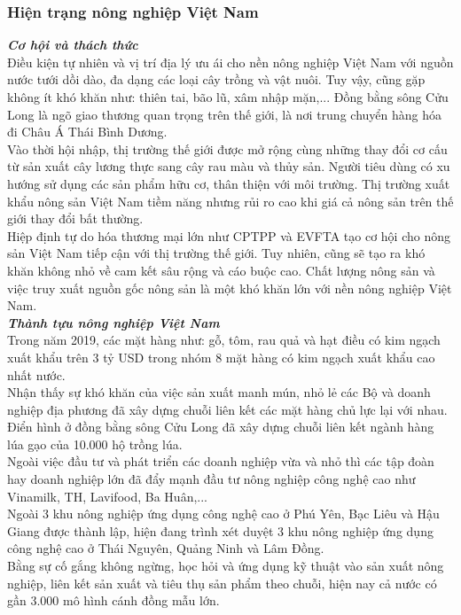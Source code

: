 \subsubsection{Hiện trạng nông nghiệp Việt Nam}
\textbf{\textit{Cơ hội và thách thức}}\\
\indent Điều kiện tự nhiên và vị trí địa lý ưu ái cho nền nông nghiệp Việt Nam với nguồn nước tưới dồi dào, đa dạng các loại cây trồng và vật nuôi. Tuy vậy, cũng gặp không ít khó khăn như: thiên tai, bão lũ, xâm nhập mặn,... Đồng bằng sông Cửu Long là ngõ giao thương quan trọng trên thế giới, là nơi trung chuyển hàng hóa đi Châu Á Thái Bình Dương.\\
\indent Vào thời hội nhập, thị trường thế giới được mở rộng cùng những thay đổi cơ cấu từ sản xuất cây lương thực sang cây rau màu và thủy sản. Người tiêu dùng có xu hướng sử dụng các sản phẩm hữu cơ, thân thiện với môi trường. Thị trường xuất khẩu nông sản Việt Nam tiềm năng nhưng rủi ro cao khi giá cả nông sản trên thế giới thay đổi bất thường.\\
\indent Hiệp định tự do hóa thương mại lớn như CPTPP và EVFTA tạo cơ hội cho nông sản Việt Nam tiếp cận với thị trường thế giới. Tuy nhiên, cũng sẽ tạo ra khó khăn không nhỏ về cam kết sâu rộng và cáo buộc cao. Chất lượng nông sản và việc truy xuất nguồn gốc nông sản là một khó khăn lớn với nền nông nghiệp Việt Nam.\\
\indent \textbf{\textit{Thành tựu nông nghiệp Việt Nam}}\\
\indent Trong năm 2019, các mặt hàng như: gỗ, tôm, rau quả và hạt điều có kim ngạch xuất khẩu trên 3 tỷ USD trong nhóm 8 mặt hàng có kim ngạch xuất khẩu cao nhất nước.\\
\indent Nhận thấy sự khó khăn của việc sản xuất manh mún, nhỏ lẻ các Bộ và doanh nghiệp địa phương đã xây dựng chuỗi liên kết các mặt hàng chủ lực lại với nhau. Điển hình ở đồng bằng sông Cửu Long đã xây dựng chuỗi liên kết ngành hàng lúa gạo của 10.000 hộ trồng lúa.\\
\indent Ngoài việc đầu tư và phát triển các doanh nghiệp vừa và nhỏ thì các tập đoàn hay doanh nghiệp lớn đã đẩy mạnh đầu tư nông nghiệp công nghệ cao như Vinamilk, TH, Lavifood, Ba Huân,...\\
\indent Ngoài 3 khu nông nghiệp ứng dụng công nghệ cao ở Phú Yên, Bạc Liêu và Hậu Giang được thành lập, hiện đang trình xét duyệt 3 khu nông nghiệp ứng dụng công nghệ cao ở Thái Nguyên, Quảng Ninh và Lâm Đồng.\\
\indent Bằng sự cố gắng không ngừng, học hỏi và ứng dụng kỹ thuật vào sản xuất nông nghiệp, liên kết sản xuất và tiêu thụ sản phẩm theo chuỗi, hiện nay cả nước có gần 3.000 mô hình cánh đồng mẫu lớn.
